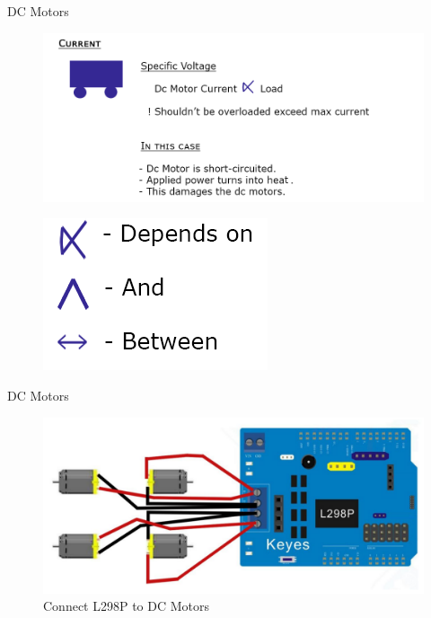 \documentclass[xcolor=table, 9pt]{beamer}
\begin{document}


\begin{frame}{DC Motors}
\begin{figure}
\includegraphics[width=0.9\linewidth]{c.png}
\end{figure}

\begin{figure}
\includegraphics[width=0.10\linewidth]{signs.png}
\end{figure}

\end{frame}




\begin{frame}{DC Motors}
\begin{figure}
\includegraphics[width=1\linewidth]{connectl298.png}
\caption{Connect L298P to DC Motors}
\end{figure}
\end{frame}

\end{document}

